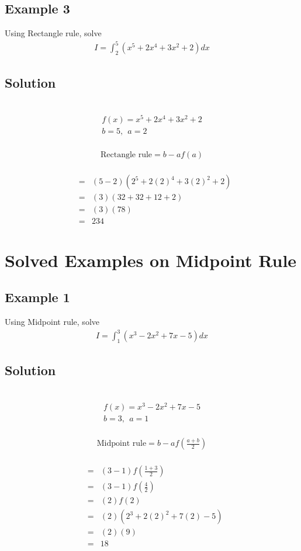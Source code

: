 \documentclass[12pt]{report}
\newcommand{\sps}{\\[0.2cm]}
\begin{document}
	\subsection{Example 3}
	Using Rectangle rule, solve
	\begin{eqnarray*}
		I = \int_2^5\left(x^5 + 2x^4 + 3x^2 + 2\right)dx
	\end{eqnarray*}
	
	\subsection*{Solution}
	{~}\\[-2.1cm]
	\begin{gather*}
		f(x) = x^5 + 2x^4 + 3x^2 + 2\sps
		b=5,~~ a = 2
	\end{gather*}
	{~}\\[-2.1cm]
	\begin{gather*}
		\text{Rectangle rule} = b-af(a)
	\end{gather*}
	{~}\\[-2.1cm]
	\begin{eqnarray*}
		&=&(5-2)(2^5 + 2(2)^4 + 3 (2)^2 + 2)\sps
		&=&(3)(32+32+12+2)\sps
		&=&(3)(78)\sps
		&=&234
	\end{eqnarray*}
	
	\section{Solved Examples on Midpoint Rule}
	\subsection{Example 1}
	Using Midpoint rule, solve
	\begin{eqnarray*}
		I = \int_1^3\left(x^3 - 2x^2 + 7x - 5\right)dx
	\end{eqnarray*}
	
	\subsection*{Solution}
	{~}\\[-2.1cm]
	\begin{gather*}
		f(x) = x^3 - 2x^2 + 7x - 5\sps
		b=3,~~ a=1
	\end{gather*}
	{~}\\[-2.1cm]
	\begin{gather*}
		\text{Midpoint rule} = b-af\left(\frac{a+b}{2}\right)
	\end{gather*}
	{~}\\[-2.1cm]
	\begin{eqnarray*}
		&=&(3-1)f\left(\frac{1+3}{2}\right)\sps
		&=&(3-1)f\left(\frac{4}{2}\right)\sps
		&=&(2)f(2)\sps
		&=&(2)(2^3+2(2)^2 + 7(2)-5)\sps
		&=&(2)(9)\sps
		&=&18
	\end{eqnarray*}
	
\end{document}
